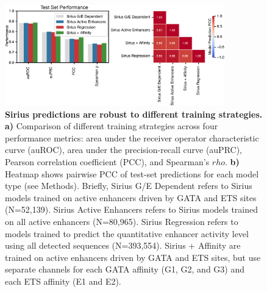 \begin{figure}[p]
    \centering
    \includegraphics[width=0.85\textwidth]{2_figures-and-files/SuppFig7.png}
    \caption[Sirius predictions are robust to different training strategies.]{\textbf{Sirius predictions are robust to different training strategies.} \textbf{a)} Comparison of different training strategies across four performance metrics: area under the receiver operator characteristic curve (auROC), area under the precision-recall curve (auPRC), Pearson correlation coefficient (PCC), and Spearman’s $rho$. \textbf{b)} Heatmap shows pairwise PCC of test-set predictions for each model type (see Methods). Briefly, Sirius G/E Dependent refers to Sirius models trained on active enhancers driven by GATA and ETS sites (N=52,139). Sirius Active Enhancers refers to Sirius models trained on all active enhancers (N=80,965). Sirius Regression refers to models trained to predict the quantitative enhancer activity level using all detected sequences (N=393,554). Sirius + Affinity are trained on active enhancers driven by GATA and ETS sites, but use separate channels for each GATA affinity (G1, G2, and G3) and each ETS affinity (E1 and E2).}
    \label{fig:2 supplementary_7}
\end{figure}

